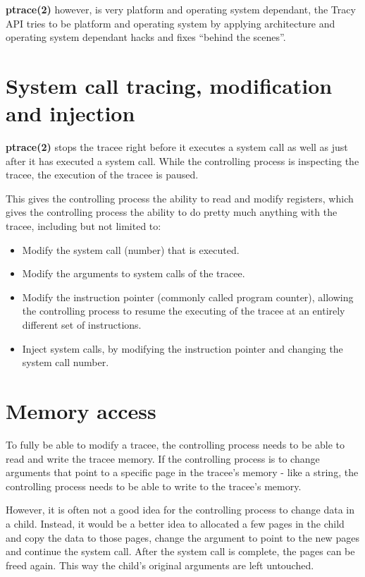 \documentclass[a4paper, twoside, 10pt, twocolumn]{report}
\begin{document}
\textbf{ptrace(2)} however, is very platform and operating system dependant,
the Tracy API tries to be platform and operating system by applying architecture
and operating system dependant hacks and fixes ``behind the scenes''.

\section{System call tracing, modification and injection}

\textbf{ptrace(2)} stops the tracee right before it executes a system call as
well as just after it has executed a system call.
While the controlling process is inspecting the tracee, the execution of the
tracee is paused.

This gives the controlling process the ability to read and modify registers,
which gives the controlling process the ability to do pretty much anything
with the tracee, including but not limited to:

\begin{itemize}
\item Modify the system call (number) that is executed.
\item Modify the arguments to system calls of the tracee.
\item Modify the instruction pointer (commonly called program counter), allowing
    the controlling process to resume the executing of the tracee at an entirely
    different set of instructions.
\item Inject system calls, by modifying the instruction pointer and changing the
    system call number.
\end{itemize}

\section{Memory access}

To fully be able to modify a tracee, the controlling process needs to be able to
read and write the tracee memory. If the controlling process is to change
arguments that point to a specific page in the tracee's memory - like a string,
the controlling process needs to be able to write to the tracee's memory.

However, it is often not a good idea for the controlling process to change data
in a child. Instead, it would be a better idea to allocated a few pages in the
child and copy the data to those pages, change the argument to point to the new
pages and continue the system call. After the system call is complete, the pages
can be freed again. This way the child's original arguments are left untouched.
\end{document}
